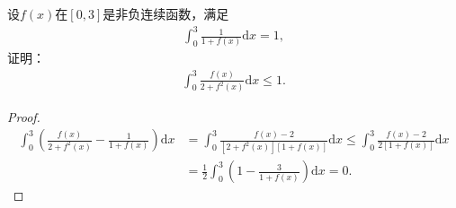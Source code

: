 \documentclass[../../main.tex]{subfiles}%
\begin{document}
\begin{example}
设$f(x)$在$[0,3]$是非负连续函数，满足
\begin{align*}
\int_{0}^{3} \frac{1}{1+f(x)}\mathrm{d}x = 1,
\end{align*}
证明：
\begin{align*}
\int_{0}^{3} \frac{f(x)}{2+f^2(x)}\mathrm{d}x \leqslant 1.
\end{align*}
\end{example}
\begin{proof}

\begin{align*}
\int_0^3{\left( \frac{f\left( x \right)}{2+f^2\left( x \right)}-\frac{1}{1+f\left( x \right)} \right) \mathrm{d}x}&=\int_0^3{\frac{f\left( x \right) -2}{\left[ 2+f^2\left( x \right) \right] \left[ 1+f\left( x \right) \right]}\mathrm{d}x}\leqslant \int_0^3{\frac{f\left( x \right) -2}{2\left[ 1+f\left( x \right) \right]}\mathrm{d}x}
\\
&=\frac{1}{2}\int_0^3{\left( 1-\frac{3}{1+f\left( x \right)} \right) \mathrm{d}x}=0.
\end{align*}
\end{proof}
\end{document}
